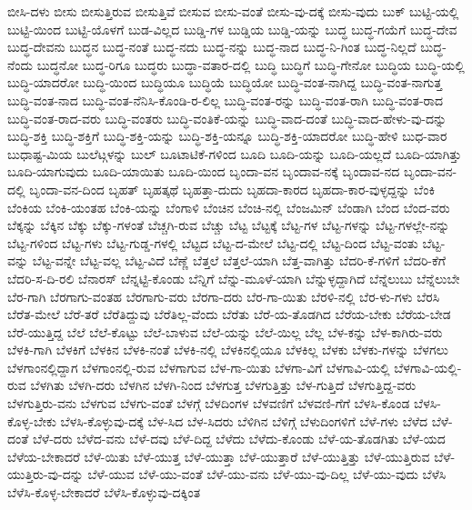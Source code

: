 {ಬೀಸಿ-ದಳು
ಬೀಸು
ಬೀಸುತ್ತಿರುವ
ಬೀಸುತ್ತಿವೆ
ಬೀಸುವ
ಬೀಸು-ವಂತೆ
ಬೀಸು-ವು-ದಕ್ಕೆ
ಬೀಸು-ವುದು
ಬುಕ್
ಬುಟ್ಟಿ-ಯಲ್ಲಿ
ಬುಟ್ಟಿ-ಯಿಂದ
ಬುಟ್ಟಿ-ಯೊಳಗೆ
ಬುಡ-ವಿಲ್ಲದ
ಬುಡ್ಡಿ-ಗಳ
ಬುಡ್ಡಿಯ
ಬುಡ್ಡಿ-ಯನ್ನು
ಬುದ್ಧ
ಬುದ್ಧ-ಗಯೆಗೆ
ಬುದ್ಧ-ದೇವ
ಬುದ್ಧ-ದೇವನು
ಬುದ್ಧನ
ಬುದ್ಧ-ನಂತೆ
ಬುದ್ಧ-ನದು
ಬುದ್ಧ-ನನ್ನು
ಬುದ್ಧ-ನಾದ
ಬುದ್ಧ-ನಿ-ಗಿಂತ
ಬುದ್ಧ-ನಿಲ್ಲದೆ
ಬುದ್ಧ-ನೆಂದು
ಬುದ್ಧನೋ
ಬುದ್ಧ-ರಿಗೂ
ಬುದ್ಧರು
ಬುದ್ಧಾ-ವತಾರ-ದಲ್ಲಿ
ಬುದ್ಧಿ
ಬುದ್ಧಿಗೆ
ಬುದ್ಧಿ-ಗೇನೋ
ಬುದ್ಧಿಯ
ಬುದ್ಧಿ-ಯಲ್ಲಿ
ಬುದ್ಧಿ-ಯಾದರೋ
ಬುದ್ಧಿ-ಯಿಂದ
ಬುದ್ಧಿಯೂ
ಬುದ್ಧಿಯೆ
ಬುದ್ಧಿಯೋ
ಬುದ್ಧಿ-ವಂತ-ನಾಗಿದ್ದ
ಬುದ್ಧಿ-ವಂತ-ನಾಗುತ್ತ
ಬುದ್ಧಿ-ವಂತ-ನಾದ
ಬುದ್ಧಿ-ವಂತ-ನೆನಿಸಿ-ಕೊಂಡಿ-ರ-ಲಿಲ್ಲ
ಬುದ್ಧಿ-ವಂತ-ರನ್ನು
ಬುದ್ಧಿ-ವಂತ-ರಾಗಿ
ಬುದ್ಧಿ-ವಂತ-ರಾದ
ಬುದ್ಧಿ-ವಂತ-ರಾದ-ವರು
ಬುದ್ಧಿ-ವಂತರು
ಬುದ್ಧಿ-ವಂತಿಕೆ-ಯನ್ನು
ಬುದ್ಧಿ-ವಾದ-ದಂತೆ
ಬುದ್ಧಿ-ವಾದ-ಹೇಳು-ವು-ದನ್ನು
ಬುದ್ಧಿ-ಶಕ್ತಿ
ಬುದ್ಧಿ-ಶಕ್ತಿಗೆ
ಬುದ್ಧಿ-ಶಕ್ತಿ-ಯನ್ನು
ಬುದ್ಧಿ-ಶಕ್ತಿ-ಯನ್ನೂ
ಬುದ್ಧಿ-ಶಕ್ತಿ-ಯಾದರೋ
ಬುದ್ಧಿ-ಹೇಳಿ
ಬುಧ-ವಾರ
ಬುಧಾಷ್ಟ-ಮಿಯ
ಬುಲೆಟ್ಗಳನ್ನು
ಬುಲ್
ಬೂಟಾಟಿಕೆ-ಗಳಿಂದ
ಬೂದಿ
ಬೂದಿ-ಯನ್ನು
ಬೂದಿ-ಯಲ್ಲದೆ
ಬೂದಿ-ಯಾಗಿತ್ತು
ಬೂದಿ-ಯಾಗುವುದು
ಬೂದಿ-ಯಾಯಿತು
ಬೂದಿ-ಯಿಂದ
ಬೃಂದಾ-ವನ
ಬೃಂದಾವ-ನಕ್ಕೆ
ಬೃಂದಾವ-ನದ
ಬೃಂದಾ-ವನ-ದಲ್ಲಿ
ಬೃಂದಾ-ವನ-ದಿಂದ
ಬೃಹತ್
ಬೃಹತ್ಕಥೆ
ಬೃಹತ್ತಾ-ದುದು
ಬೃಹದಾ-ಕಾರದ
ಬೃಹದಾ-ಕಾರ-ವುಳ್ಳದ್ದನ್ನು
ಬೆಂಕಿ
ಬೆಂಕಿಯ
ಬೆಂಕಿ-ಯಂತಹ
ಬೆಂಕಿ-ಯನ್ನು
ಬೆಂಗಾಳಿ
ಬೆಂಚಿನ
ಬೆಂಚಿ-ನಲ್ಲಿ
ಬೆಂಜಮಿನ್
ಬೆಂಡಾಗಿ
ಬೆಂದ
ಬೆಂದ-ವರು
ಬೆಕ್ಕನ್ನು
ಬೆಕ್ಕಿನ
ಬೆಕ್ಕು
ಬೆಕ್ಕು-ಗಳಂತೆ
ಬೆಚ್ಚಗಿ-ರುವ
ಬೆಚ್ಚು
ಬೆಟ್ಟ
ಬೆಟ್ಟಕ್ಕೆ
ಬೆಟ್ಟ-ಗಳ
ಬೆಟ್ಟ-ಗಳನ್ನು
ಬೆಟ್ಟ-ಗಳಲ್ಲೇ-ನನ್ನು
ಬೆಟ್ಟ-ಗಳಿಂದ
ಬೆಟ್ಟ-ಗಳು
ಬೆಟ್ಟ-ಗುಡ್ಡ-ಗಳಲ್ಲಿ
ಬೆಟ್ಟದ
ಬೆಟ್ಟ-ದ-ಮೇಲೆ
ಬೆಟ್ಟ-ದಲ್ಲಿ
ಬೆಟ್ಟ-ದಿಂದ
ಬೆಟ್ಟ-ವಂತು
ಬೆಟ್ಟ-ವನ್ನು
ಬೆಟ್ಟ-ವನ್ನೇ
ಬೆಟ್ಟ-ವಲ್ಲ
ಬೆಟ್ಟ-ವಿದೆ
ಬೆಣ್ಣೆ
ಬೆತ್ತಲೆ
ಬೆತ್ತಲೆ-ಯಾಗಿ
ಬೆತ್ತ-ವಾಗಿತ್ತು
ಬೆದರಿ-ಕೆ-ಗಳಿಗೆ
ಬೆದರಿ-ಕೆಗೆ
ಬೆದರಿ-ಸ-ದಿ-ರಲಿ
ಬೆನಾರಸ್
ಬೆನ್ನಟ್ಟಿ-ಕೊಂಡು
ಬೆನ್ನಿಗೆ
ಬೆನ್ನು-ಮೂಳೆ-ಯಾಗಿ
ಬೆನ್ನುಳ್ಳದ್ದಾಗಿದೆ
ಬೆನ್ನೆಲುಬು
ಬೆನ್ನೆಲುಬೇ
ಬೆರ-ಗಾಗಿ
ಬೆರಗಾಗು-ವಂತಹ
ಬೆರಗಾಗು-ವರು
ಬೆರಗಾ-ದರು
ಬೆರ-ಗಾ-ಯಿತು
ಬೆರಳಿ-ನಲ್ಲಿ
ಬೆರ-ಳು-ಗಳು
ಬೆರಸಿ
ಬೆರೆತ-ಮೇಲೆ
ಬೆರೆ-ತರೆ
ಬೆರೆತಿದ್ದುವು
ಬೆರೆತಿಲ್ಲ-ವೆಂದು
ಬೆರೆತು
ಬೆರೆ-ಯ-ತೊಡಗಿದ
ಬೆರೆಯ-ಬೇಕು
ಬೆರೆಯ-ಬೇಡ
ಬೆರೆ-ಯುತ್ತಿದ್ದ
ಬೆಲೆ
ಬೆಲೆ-ಕೊಟ್ಟು
ಬೆಲೆ-ಬಾಳುವ
ಬೆಲೆ-ಯನ್ನು
ಬೆಲೆ-ಯಿಲ್ಲ
ಬೆಲ್ಲ
ಬೆಳ-ಕನ್ನು
ಬೆಳ-ಕಾಗಿರು-ವರು
ಬೆಳಕಿ-ಗಾಗಿ
ಬೆಳಕಿಗೆ
ಬೆಳಕಿನ
ಬೆಳಕಿ-ನಂತೆ
ಬೆಳಕಿ-ನಲ್ಲಿ
ಬೆಳಕಿನಲ್ಲಿಯೂ
ಬೆಳಕಿಲ್ಲ
ಬೆಳಕು
ಬೆಳಕು-ಗಳನ್ನು
ಬೆಳಗಲು
ಬೆಳಗಾಂನಲ್ಲಿದ್ದಾಗ
ಬೆಳಗಾಂನಲ್ಲಿ-ರುವ
ಬೆಳಗಾಗುವ
ಬೆಳ-ಗಾ-ಯಿತು
ಬೆಳಗಾ-ವಿಗೆ
ಬೆಳಗಾವಿ-ಯಲ್ಲಿ
ಬೆಳಗಾವಿ-ಯಲ್ಲಿ-ರುವ
ಬೆಳಗಿತು
ಬೆಳಗಿ-ದರು
ಬೆಳಗಿನ
ಬೆಳಗಿ-ನಿಂದ
ಬೆಳಗುತ್ತ
ಬೆಳಗುತ್ತಿತ್ತು
ಬೆಳ-ಗುತ್ತಿದೆ
ಬೆಳಗುತ್ತಿದ್ದ-ವರು
ಬೆಳಗುತ್ತಿರು-ವನು
ಬೆಳಗುವ
ಬೆಳಗು-ವಂತೆ
ಬೆಳಗ್ಗೆ
ಬೆಳದಿಂಗಳ
ಬೆಳವಣಿಗೆ
ಬೆಳವಣಿ-ಗೆಗೆ
ಬೆಳಸಿ-ಕೊಂಡ
ಬೆಳಸಿ-ಕೊಳ್ಳ-ಬೇಕು
ಬೆಳಸಿ-ಕೊಳ್ಳುವು-ದಕ್ಕೆ
ಬೆಳ-ಸಿದ
ಬೆಳ-ಸಿದರು
ಬೆಳಿಗಿನ
ಬೆಳಿಗ್ಗೆ
ಬೆಳುದಿಂಗಳಿಗೆ
ಬೆಳೆ-ಗಳು
ಬೆಳೆದ
ಬೆಳೆ-ದಂತೆ
ಬೆಳೆ-ದರು
ಬೆಳೆದ-ವನು
ಬೆಳೆ-ದವು
ಬೆಳೆ-ದಿದ್ದ
ಬೆಳೆದು
ಬೆಳೆದು-ಕೊಂಡು
ಬೆಳೆ-ಯ-ತೊಡಗಿತು
ಬೆಳೆ-ಯದ
ಬೆಳೆಯ-ಬೇಕಾದರೆ
ಬೆಳೆ-ಯಿತು
ಬೆಳೆ-ಯುತ್ತ
ಬೆಳೆ-ಯುತ್ತಾ
ಬೆಳೆ-ಯುತ್ತಾರೆ
ಬೆಳೆ-ಯುತ್ತಿತ್ತು
ಬೆಳೆ-ಯುತ್ತಿರುವ
ಬೆಳೆ-ಯುತ್ತಿರು-ವು-ದನ್ನು
ಬೆಳೆ-ಯುವ
ಬೆಳೆ-ಯು-ವಂತೆ
ಬೆಳೆ-ಯು-ವನು
ಬೆಳೆ-ಯು-ವು-ದಿಲ್ಲ
ಬೆಳೆ-ಯು-ವುದು
ಬೆಳೆಸಿ
ಬೆಳೆಸಿ-ಕೊಳ್ಳ-ಬೇಕಾದರೆ
ಬೆಳೆಸಿ-ಕೊಳ್ಳುವು-ದಕ್ಕಿಂತ
}
